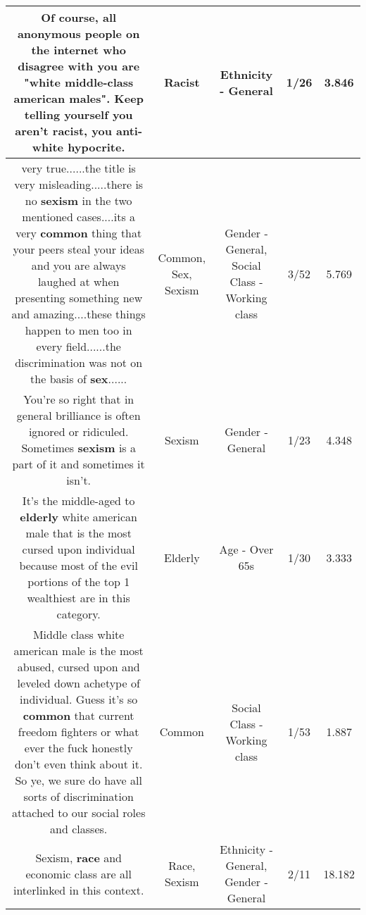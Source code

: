 \documentclass[11pt]{article}
\newlength\mylength
\begin{document}
\begin{center}
\begin{longtable}{|C{.65\mylength}|C{.30\mylength}|C{.12\mylength}|C{.12\mylength}|C{.12\mylength}|}
  \small Of course, all anonymous people on the internet who disagree with you are "white middle-class american males".  Keep telling yourself you aren't \textbf{racist}, you anti-white hypocrite.\normalsize   & Racist & Ethnicity - General & 1/26 & 3.846 \\  \hline
  \small very true......the title is very misleading.....there is no \textbf{sexism} in the two mentioned cases....its a very \textbf{common} thing that your peers steal your ideas and you are always laughed at when presenting something new and amazing....these things happen to men too in every field......the discrimination was not on the basis of \textbf{sex}......\normalsize   & Common, Sex, Sexism & Gender - General, Social Class - Working class & 3/52 & 5.769 \\  \hline
  \small You're so right that in general brilliance is often ignored or ridiculed. Sometimes \textbf{sexism} is a part of it and sometimes it isn't.\normalsize   & Sexism & Gender - General & 1/23 & 4.348 \\  \hline
  \small It's the middle-aged to \textbf{elderly} white american male that is the most cursed upon individual because most of the evil portions of the top 1 wealthiest are in this category.\normalsize   & Elderly & Age - Over 65s & 1/30 & 3.333 \\  \hline
  \small Middle class white american male is the most abused, cursed upon and leveled down achetype of individual. Guess it's so \textbf{common} that current freedom fighters or what ever the fuck honestly don't even think about it. So ye, we sure do have all sorts of discrimination attached to our social roles and classes.\normalsize   & Common & Social Class - Working class & 1/53 & 1.887 \\  \hline
  \small Sexism, \textbf{race} and economic class are all interlinked in this context.\normalsize   & Race, Sexism & Ethnicity - General, Gender - General & 2/11 & 18.182 \\  \hline

\end{longtable}
\end{center}
\end{document}
